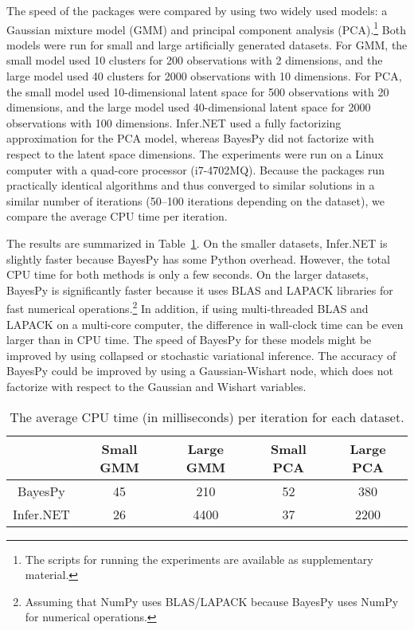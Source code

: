 \documentclass[twoside,11pt]{article}
\begin{document}
The speed of the packages were compared by using two widely used models: a
Gaussian mixture model (GMM) and principal component analysis
(PCA).\footnote{The scripts for running the experiments are available as
  supplementary material.}  Both models were run for small and large
artificially generated datasets.  For GMM, the small model used 10 clusters for
200 observations with 2 dimensions, and the large model used 40 clusters for
2000 observations with 10 dimensions.  For PCA, the small model used
10-dimensional latent space for 500 observations with 20 dimensions, and the
large model used 40-dimensional latent space for 2000 observations with 100
dimensions.  Infer.NET used a fully factorizing approximation for the PCA model,
whereas BayesPy did not factorize with respect to the latent space dimensions.
The experiments were run on a Linux computer with a quad-core processor
(i7-4702MQ).  Because the packages run practically identical algorithms and thus
converged to similar solutions in a similar number of iterations (50--100
iterations depending on the dataset), we compare the average CPU time per
iteration.


The results are summarized in Table~\ref{tab:speed}.  On the smaller datasets,
Infer.NET is slightly faster because BayesPy has some Python overhead.  However,
the total CPU time for both methods is only a few seconds.  On the larger
datasets, BayesPy is significantly faster because it uses BLAS and LAPACK
libraries for fast numerical operations.\footnote{Assuming that NumPy uses
  BLAS/LAPACK because BayesPy uses NumPy for numerical operations.}  In
addition, if using multi-threaded BLAS and LAPACK on a multi-core computer, the
difference in wall-clock time can be even larger than in CPU time.  The speed of
BayesPy for these models might be improved by using collapsed or stochastic
variational inference.  The accuracy of BayesPy could be improved by using a
Gaussian-Wishart node, which does not factorize with respect to the Gaussian and
Wishart variables.

\begin{table}[tb]
  \centering
  \caption{The average CPU time (in milliseconds) per iteration for each dataset.}
  \small
  \begin{tabular}{ccccc}
    &
    Small GMM
    &
    Large GMM
    &
    Small PCA
    &
    Large PCA
    \\
    \hline
    BayesPy     & 45 & 210  & 52 & 380
    \\
    Infer.NET   & 26 & 4400 & 37 & 2200
  \end{tabular}
  \label{tab:speed}
\end{table}
\end{document}
